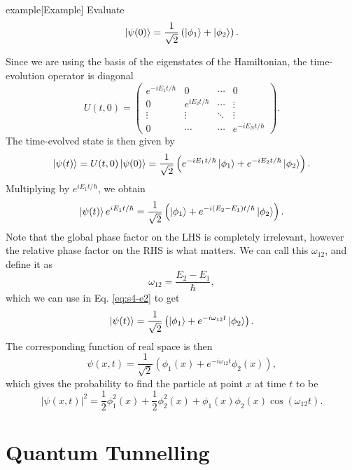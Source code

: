 \documentclass{article}
\begin{document}
\begin{callout}{example}[Example]
\label{example:s4-e2}
Evaluate
\[
    \ket{\psi (0)}=\frac{1}{\sqrt{2}}\left( \ket{\phi _1}+\ket{\phi _2} \right).
\]

Since we are using the basis of the eigenstates of the Hamiltonian, the time-evolution operator is diagonal
\[
    U(t,0)=\begin{pmatrix}
        e^{-iE_1t/\hbar} & 0 & \cdots & 0 \\
        0 & e^{iE_2t/\hbar} & \cdots & \vdots \\
        \vdots & \vdots & \ddots & \vdots \\
        0 & \cdots & \cdots & e^{-iE_Nt/\hbar}
    \end{pmatrix}.
\]
The time-evolved state is then given by
\[
    \ket{\psi (t)}=U(t,0)\ket{\psi (0)}=\frac{1}{\sqrt{2}}\left( e^{-iE_1t/\hbar}\ket{\phi _1}+e^{-iE_2t/\hbar}\ket{\phi _2} \right).
\]
Multiplying by $e^{iE_1t/\hbar}$, we obtain
\begin{equation}
    \ket{\psi (t)}e^{iE_1t/\hbar}=\frac{1}{\sqrt{2}}\left( \ket{\phi _1}+e^{-i(E_2-E_1)t/\hbar}\ket{\phi _2} \right). \label{eq:s4-e2}
\end{equation}
Note that the global phase factor on the LHS is completely irrelevant, however the relative phase factor on the RHS is what matters. We can call this $\omega _{12}$, and define it as
\[
    \omega _{12}=\frac{E_2-E_1}{\hbar},
\]
which we can use in Eq. \ref{eq:s4-e2} to get
\[
    \ket{\psi (t)}=\frac{1}{\sqrt{2}}\left( \ket{\phi _1}+e^{-i\omega _{12}t}\ket{\phi _2} \right).
\]
The corresponding function of real space is then
\[
    \psi (x,t)=\frac{1}{\sqrt{2}}\left( \phi _1(x)+e^{-i\omega _{12}t}\phi_2(x) \right),
\]
which gives the probability to find the particle at point $x$ at time $t$ to be
\[
    \left| \psi (x,t) \right|^2=\frac{1}{2}\phi _1^2(x)+\frac{1}{2}\phi _2^2(x)+\phi _1(x)\phi _2(x)\cos(\omega _{12}t).
\]
\end{callout}

\section{Quantum Tunnelling}
\end{document}
